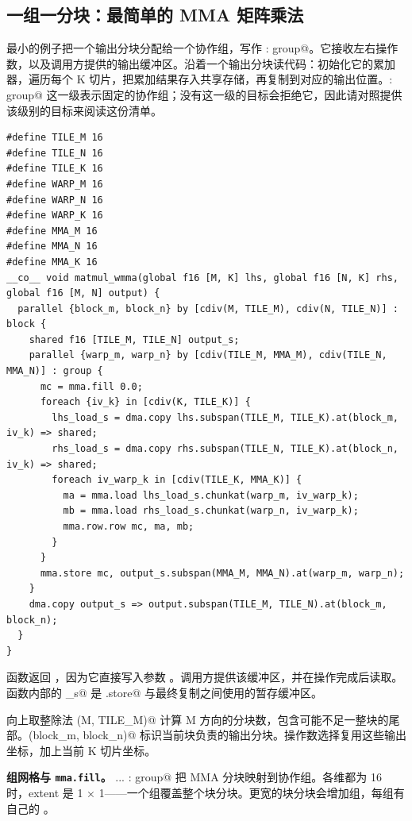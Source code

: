 \subsection*{一组一分块：最简单的 MMA 矩阵乘法}

最小的例子把一个输出分块分配给一个协作组，写作 \co@: group@。它接收左右操作数，以及调用方提供的输出缓冲区。沿着一个输出分块读代码：初始化它的累加器，遍历每个 K 切片，把累加结果存入共享存储，再复制到对应的输出位置。\co@: group@ 这一级表示固定的协作组；没有这一级的目标会拒绝它，因此请对照提供该级别的目标来阅读这份清单。

\begin{lstlisting}[language=croqtile,caption={一组一分块：最简单的 MMA 矩阵乘法}]
#define TILE_M 16
#define TILE_N 16
#define TILE_K 16
#define WARP_M 16
#define WARP_N 16
#define WARP_K 16
#define MMA_M 16
#define MMA_N 16
#define MMA_K 16
__co__ void matmul_wmma(global f16 [M, K] lhs, global f16 [N, K] rhs, global f16 [M, N] output) {
  parallel {block_m, block_n} by [cdiv(M, TILE_M), cdiv(N, TILE_N)] : block {
    shared f16 [TILE_M, TILE_N] output_s;
    parallel {warp_m, warp_n} by [cdiv(TILE_M, MMA_M), cdiv(TILE_N, MMA_N)] : group {
      mc = mma.fill 0.0;
      foreach {iv_k} in [cdiv(K, TILE_K)] {
        lhs_load_s = dma.copy lhs.subspan(TILE_M, TILE_K).at(block_m, iv_k) => shared;
        rhs_load_s = dma.copy rhs.subspan(TILE_N, TILE_K).at(block_n, iv_k) => shared;
        foreach iv_warp_k in [cdiv(TILE_K, MMA_K)] {
          ma = mma.load lhs_load_s.chunkat(warp_m, iv_warp_k);
          mb = mma.load rhs_load_s.chunkat(warp_n, iv_warp_k);
          mma.row.row mc, ma, mb;
        }
      }
      mma.store mc, output_s.subspan(MMA_M, MMA_N).at(warp_m, warp_n);
    }
    dma.copy output_s => output.subspan(TILE_M, TILE_N).at(block_m, block_n);
  }
}
\end{lstlisting}

函数返回 \co@void@，因为它直接写入参数 \co@output@。调用方提供该缓冲区，并在操作完成后读取。函数内部的 \co@output_s@ 是 \co@mma.store@ 与最终复制之间使用的暂存缓冲区。

向上取整除法 \co@cdiv(M, TILE_M)@ 计算 M 方向的分块数，包含可能不足一整块的尾部。\co@(block_m, block_n)@ 标识当前块负责的输出分块。操作数选择复用这些输出坐标，加上当前 K 切片坐标。

\textbf{组网格与 \texttt{mma.fill}。}  ... : group@ 把 MMA 分块映射到协作组。各维都为 16 时，extent 是 1 × 1——一个组覆盖整个块分块。更宽的块分块会增加组，每组有自己的 \co@mc@。

